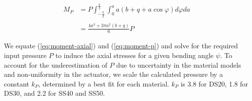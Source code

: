 \begin{align}
    M_P & = P \int_{-\frac{\pi}{2}}^{\frac{\pi}{2}}\int_0^{a} a(b+q+a\cos{\varphi})d\varphi da \\ \nonumber \\
    & = \frac{4 a^{3} + 3 \pi a^{2} (b+q)}{6} P 
    \label{eq:moment-p}
\end{align}

We equate (\ref{eq:moment-axial}) and (\ref{eq:moment-p}) and solve for the required input pressure $P$ to induce the axial stresses for a given bending angle $\psi$. To account for the underestimation of $P$ due to uncertainty in the material models and non-uniformity in the actuator, we scale the calculated pressure by a constant $k_P$, determined by a best fit for each material. $k_P$ is 3.8 for DS20, 1.8 for DS30, and 2.2 for SS40 and SS50. 